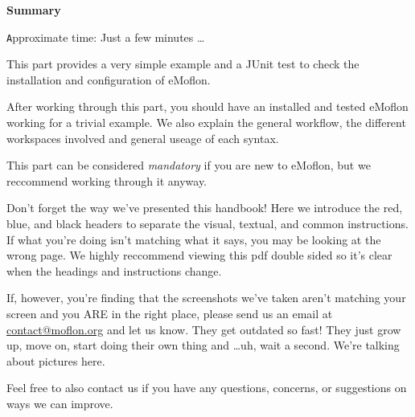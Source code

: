 \vspace*{2cm}

{\Huge \bfseries Summary}
\vspace{0.5cm}

{\small \texttt Approximate time: Just a few minutes \ldots}

This part provides a very simple example and a JUnit test to check the installation and configuration of eMoflon.

After working through this part, you should have an installed and tested eMoflon working for a trivial example.
We also explain the general workflow, the different workspaces involved and general useage of each syntax.

This part can be considered \emph{mandatory} if you are new to eMoflon, but we reccommend working through it anyway.

Don't forget the way we've presented this handbook! Here we introduce the red, blue, and black headers to separate the visual, textual, and common instructions. 
If what you're doing isn't matching what it says, you may be looking at the wrong page. We highly reccommend viewing this pdf double sided so it's clear when the headings and instructions change.

If, however, you're finding that the screenshots we've taken aren't matching your screen and you ARE in the right place, please send us an email at \href{mailto:contact@moflon.org}{contact@moflon.org} and let us know. They get outdated so fast! They just grow up, move on, start doing their own thing and \ldots uh, wait a second. We're talking about pictures here.

Feel free to also contact us if you have any questions, concerns, or suggestions on ways we can improve.